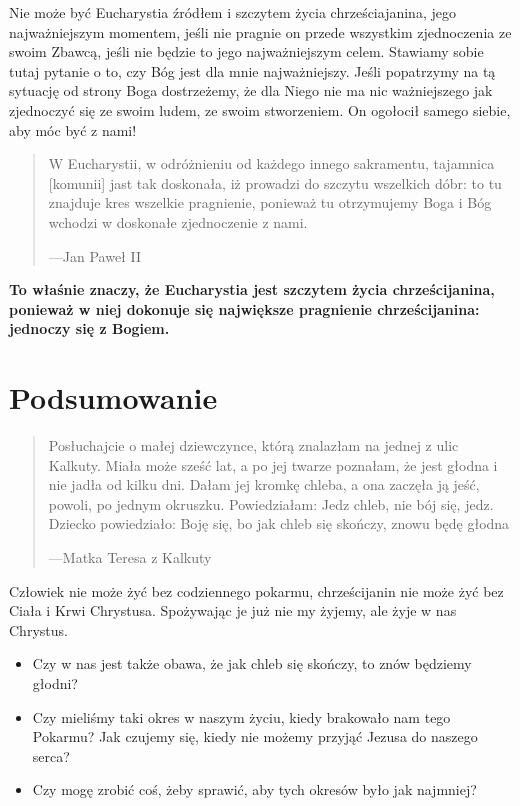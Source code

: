 \documentclass[a5paper,10pt,polish]{book}
\begin{document}
Nie może być Eucharystia źródłem i szczytem życia chrześciajanina, jego najważniejszym momentem, jeśli nie pragnie on przede wszystkim zjednoczenia ze swoim Zbawcą, jeśli nie będzie to jego najważniejszym celem. Stawiamy sobie tutaj pytanie o to, czy Bóg jest dla mnie najważniejszy. Jeśli popatrzymy na tą sytuację od strony Boga dostrzeżemy, że dla Niego nie ma nic ważniejszego jak zjednoczyć się ze swoim ludem, ze swoim stworzeniem. On ogołocił samego siebie, aby móc być z nami!
\begin{quote}

W Eucharystii, w odróżnieniu od każdego innego sakramentu, tajamnica {[}komunii{]} jast tak doskonała, iż prowadzi do szczytu wszelkich dóbr: to tu znajduje kres wszelkie pragnienie, ponieważ tu otrzymujemy Boga i Bóg wchodzi w doskonałe zjednoczenie z nami.

\begin{flushright}
---Jan Paweł II
\end{flushright}
\end{quote}

\textbf{To właśnie znaczy, że Eucharystia jest szczytem życia chrześcijanina, ponieważ w niej dokonuje się największe pragnienie chrześcijanina: jednoczy się z Bogiem.}


\section{Podsumowanie}
\label{babice2006-jesien-knurow/spotkanie2:podsumowanie}\begin{quote}

Posłuchajcie o małej dziewczynce, którą znalazłam na jednej z ulic Kalkuty. Miała może sześć lat, a po jej twarze poznałam, że jest głodna i nie jadła od kilku dni. Dałam jej kromkę chleba, a ona zaczęła ją jeść, powoli, po jednym okruszku. Powiedziałam: Jedz chleb, nie bój się, jedz. Dziecko powiedziało: Boję się, bo jak chleb się skończy, znowu będę głodna

\begin{flushright}
---Matka Teresa z Kalkuty
\end{flushright}
\end{quote}

Człowiek nie może żyć bez codziennego pokarmu, chrześcijanin nie może żyć bez Ciała i Krwi Chrystusa. Spożywając je już nie my żyjemy, ale żyje w nas Chrystus.
\begin{itemize}
\item {} 
Czy w nas jest także obawa, że jak chleb się skończy, to znów będziemy głodni?

\item {} 
Czy mieliśmy taki okres w naszym życiu, kiedy brakowało nam tego Pokarmu? Jak czujemy się, kiedy nie możemy przyjąć Jezusa do naszego serca?

\item {} 
Czy mogę zrobić coś, żeby sprawić, aby tych okresów było jak najmniej?

\end{itemize}
\end{document}
